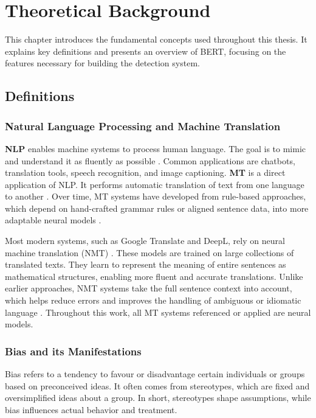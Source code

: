 \chapter{Theoretical Background}
This chapter introduces the fundamental concepts used throughout this thesis. It explains key definitions and presents an overview of BERT, focusing on the features necessary for building the detection system.


\section{Definitions}
\subsection{Natural Language Processing and Machine Translation}
    \textbf{NLP} enables machine systems to process human language. The goal is to mimic and understand it as fluently as possible \parencite{smacchiaDoesAIReflect2024,ullmannGenderBiasMachine2022}. Common applications are chatbots, translation tools, speech recognition, and image captioning. \textbf{MT} is a direct application of NLP. It performs automatic translation of text from one language to another \parencite{linMachineTranslationAcademic2009}. Over time, MT systems have developed from rule-based approaches, which depend on hand-crafted grammar rules or aligned sentence data, into more adaptable neural models \parencite{chakravarthiSurveyOrthographicInformation2021}.

    Most modern systems, such as Google Translate and DeepL, rely on neural machine translation (NMT) \parencite{wuGooglesNeuralMachine2016,deeplHowDoesDeepL2021}. These models are trained on large collections of translated texts. They learn to represent the meaning of entire sentences as mathematical structures, enabling more fluent and accurate translations. Unlike earlier approaches, NMT systems take the full sentence context into account, which helps reduce errors and improves the handling of ambiguous or idiomatic language \parencite{wuGooglesNeuralMachine2016}. Throughout this work, all MT systems referenced or applied are neural models.

\subsection{Bias and its Manifestations}
\label{subsection:manifestations_of_gb}
    Bias refers to a tendency to favour or disadvantage certain individuals or groups based on preconceived ideas. It often comes from stereotypes, which are fixed and oversimplified ideas about a group. In short, stereotypes shape assumptions, while bias influences actual behavior and treatment.

